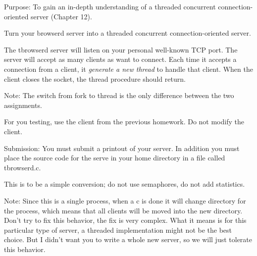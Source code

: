 

\parindent 0pt

Purpose: To gain an in-depth understanding of
a threaded concurrent connection-oriented server (Chapter 12).

Turn your browserd server into a {\ltt{}threaded} concurrent
connection-oriented server.

The {\ltt{}tbrowserd} server will listen on your personal well-known TCP port.
The server will accept as many clients as want to connect.
Each time it accepts a connection from a client,
it {\it generate a new thread} to handle that client. 
When the client closes the socket, the thread procedure should return.

Note: The switch from fork to thread is the only difference between
the two assignments.

For you testing, use the client from the previous homework.
Do not modify the client.

Submission: You must submit a printout of your server.
In addition you must place the source code for the serve in your
home directory in a file called {\ltt{}tbrowserd.c}.

This is to be a simple conversion;
do not use semaphores, do not add statistics.

Note: Since this is a single process, when a {\ltt{}c} is done
it will change directory for the process, which means that
all clients will be moved into the new directory.
Don't try to fix this behavior, the fix is very complex.
What it means is for this particular type of server,
a threaded implementation might not be the best choice.
But I didn't want you to write a whole new server, so
we will just tolerate this behavior.
\bye
